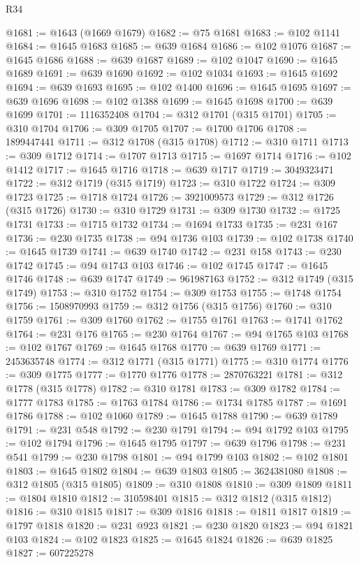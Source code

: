 \begin{lexlean}{R34}
\begin{coremodule}
@1681 := @1643 (@1669 @1679)
@1682 := @75 @1681
@1683 := @102 @1141
@1684 := @1645 @1683
@1685 := @639 @1684
@1686 := @102 @1076
@1687 := @1645 @1686
@1688 := @639 @1687
@1689 := @102 @1047
@1690 := @1645 @1689
@1691 := @639 @1690
@1692 := @102 @1034
@1693 := @1645 @1692
@1694 := @639 @1693
@1695 := @102 @1400
@1696 := @1645 @1695
@1697 := @639 @1696
@1698 := @102 @1388
@1699 := @1645 @1698
@1700 := @639 @1699
@1701 := 1116352408
@1704 := @312 @1701 (@315 @1701)
@1705 := @310 @1704
@1706 := @309 @1705
@1707 := @1700 @1706
@1708 := 1899447441
@1711 := @312 @1708 (@315 @1708)
@1712 := @310 @1711
@1713 := @309 @1712
@1714 := @1707 @1713
@1715 := @1697 @1714
@1716 := @102 @1412
@1717 := @1645 @1716
@1718 := @639 @1717
@1719 := 3049323471
@1722 := @312 @1719 (@315 @1719)
@1723 := @310 @1722
@1724 := @309 @1723
@1725 := @1718 @1724
@1726 := 3921009573
@1729 := @312 @1726 (@315 @1726)
@1730 := @310 @1729
@1731 := @309 @1730
@1732 := @1725 @1731
@1733 := @1715 @1732
@1734 := @1694 @1733
@1735 := @231 @167
@1736 := @230 @1735
@1738 := @94 @1736 @103
@1739 := @102 @1738
@1740 := @1645 @1739
@1741 := @639 @1740
@1742 := @231 @158
@1743 := @230 @1742
@1745 := @94 @1743 @103
@1746 := @102 @1745
@1747 := @1645 @1746
@1748 := @639 @1747
@1749 := 961987163
@1752 := @312 @1749 (@315 @1749)
@1753 := @310 @1752
@1754 := @309 @1753
@1755 := @1748 @1754
@1756 := 1508970993
@1759 := @312 @1756 (@315 @1756)
@1760 := @310 @1759
@1761 := @309 @1760
@1762 := @1755 @1761
@1763 := @1741 @1762
@1764 := @231 @176
@1765 := @230 @1764
@1767 := @94 @1765 @103
@1768 := @102 @1767
@1769 := @1645 @1768
@1770 := @639 @1769
@1771 := 2453635748
@1774 := @312 @1771 (@315 @1771)
@1775 := @310 @1774
@1776 := @309 @1775
@1777 := @1770 @1776
@1778 := 2870763221
@1781 := @312 @1778 (@315 @1778)
@1782 := @310 @1781
@1783 := @309 @1782
@1784 := @1777 @1783
@1785 := @1763 @1784
@1786 := @1734 @1785
@1787 := @1691 @1786
@1788 := @102 @1060
@1789 := @1645 @1788
@1790 := @639 @1789
@1791 := @231 @548
@1792 := @230 @1791
@1794 := @94 @1792 @103
@1795 := @102 @1794
@1796 := @1645 @1795
@1797 := @639 @1796
@1798 := @231 @541
@1799 := @230 @1798
@1801 := @94 @1799 @103
@1802 := @102 @1801
@1803 := @1645 @1802
@1804 := @639 @1803
@1805 := 3624381080
@1808 := @312 @1805 (@315 @1805)
@1809 := @310 @1808
@1810 := @309 @1809
@1811 := @1804 @1810
@1812 := 310598401
@1815 := @312 @1812 (@315 @1812)
@1816 := @310 @1815
@1817 := @309 @1816
@1818 := @1811 @1817
@1819 := @1797 @1818
@1820 := @231 @923
@1821 := @230 @1820
@1823 := @94 @1821 @103
@1824 := @102 @1823
@1825 := @1645 @1824
@1826 := @639 @1825
@1827 := 607225278

\end{coremodule}
\end{lexlean}
